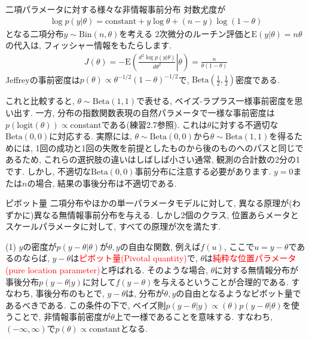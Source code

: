 \documentclass[10pt,dvipdfmx,a4]{beamer}
\newcommand{\eqn}[1]{\begin{align*}#1\end{align*}}
\newcommand{\tcr}[1]{\textcolor{red}{#1}}
\begin{document}

\begin{frame}{二項パラメータに対する様々な非情報事前分布}
対数尤度が
\eqn{\log p(y|\theta)=\text{constant}+y\log\theta+(n-y)\log (1-\theta)}
となる二項分布$y\sim \text{Bin}(n,\theta)$を考える
2次微分のルーチン評価と$\text{E}(y |\theta)=n\theta$の代入は, フィッシャー情報をもたらします.
\eqn{J(\theta)=-\text{E}\left(\left.\frac{d^2\log p(y|\theta)}{d\theta^2}\right|\theta\right)=\frac{n}{\theta(1-\theta)}}
Jeffreyの事前密度は$p(\theta)\propto\theta^{-1/2}(1-\theta)^{-1/2}$で, $\text{Beta}(\tfrac{1}{2},\tfrac{1}{2})$密度である.

これと比較すると, $\theta\sim\text{Beta}(1,1)$で表せる, ベイズ-ラプラス一様事前密度を思い出す.
一方, 分布の指数関数表現の自然パラメータで一様な事前密度は$p(\text{logit}(\theta))\propto\text{constant}$である(練習2.7参照).
これは$\theta$に対する不適切な$\text{Beta}(0,0)$に対応する.
実際には, $\theta\sim\text{Beta}(0,0)$から$\theta\sim\text{Beta}(1,1)$を得るためには, 1回の成功と1回の失敗を前提としたものから後のものへのパスと同じであるため, これらの選択肢の違いはしばしば小さい通常, 観測の合計数の2分の1です.
しかし, 不適切な$\text{Beta}(0,0)$事前分布に注意する必要があります.
$y = 0$または$n$の場合, 結果の事後分布は不適切である.
\end{frame}


\begin{frame}{ピボット量}
二項分布やほかの単一パラメータモデルに対して, 異なる原理が(わずかに)異なる無情報事前分布を与える.
しかし2個のクラス, 位置あらメータとスケールパラメータに対して, すべての原理が次を満たす.

(1) $y$の密度が$p(y-\theta|\theta)$が$\theta, y$の自由な関数, 例えば$f(u)$, ここで$u=y-\theta$であるのならば, $y-\theta$は\tcr{ピボット量(Pivotal quantity)}で, $\theta$は\tcr{純粋な位置パラメータ(pure location parameter)}と呼ばれる.
そのような場合, $\theta$に対する無情報分布が事後分布$p(y-\theta|y)$に対して$f(y-\theta)$を与えるということが合理的である.
すなわち, 事後分布のもとで, $y-\theta$は, 分布が$\theta, y$の自由となるようなピボット量であるべきである.
この条件の下で, ベイズ則$p(y-\theta|y)\propto(\theta)p(y-\theta|\theta)$を使うことで, 非情報事前密度が$\theta$上で一様であることを意味する.
すなわち, $(-\infty,\infty)$で$p(\theta)\propto\text{constant}$となる.
\end{frame}

\end{document}
